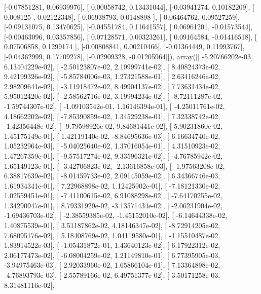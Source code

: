 \documentclass{article}
\begin{document}
       [-0.07851281,  0.06939976],
       [ 0.00058742,  0.13431044],
       [-0.03941274,  0.10182209],
       [ 0.008125  ,  0.02122348],
       [-0.06938793,  0.0148898 ],
       [ 0.06464762,  0.09527259],
       [-0.09131075,  0.13470625],
       [-0.04551784,  0.11641557],
       [ 0.06961201, -0.01573544],
       [-0.00463096,  0.03357856],
       [ 0.07128571,  0.00323261],
       [ 0.09164584, -0.01416518],
       [ 0.07506858,  0.1299174 ],
       [-0.00808841,  0.00210466],
       [-0.01364449,  0.11993767],
       [-0.04362999,  0.17709278],
       [-0.02909328, -0.01205964]]), array([[ -5.20766202e-03,   6.13404229e-02],
       [ -2.50123807e-02,   2.19999741e-02],
       [  8.40824373e-02,   9.42199326e-02],
       [ -5.85784006e-03,   1.27321588e-01],
       [  2.63416246e-02,   2.98209641e-02],
       [ -3.11918472e-02,   8.49904137e-02],
       [  7.73631434e-02,   5.95012420e-02],
       [ -2.58562716e-02,   3.19994234e-02],
       [ -8.72111287e-02,  -1.59744307e-02],
       [ -1.09103542e-01,   1.16146394e-01],
       [ -4.25011761e-02,   4.18662202e-02],
       [ -7.85390859e-02,   1.34529238e-01],
       [  7.32338742e-02,  -1.42356448e-02],
       [ -9.79598926e-02,   9.84681441e-02],
       [  5.90231860e-02,   1.45175149e-01],
       [  1.42119140e-02,  -8.84695636e-03],
       [  6.16634740e-02,   1.05232964e-03],
       [ -5.04025640e-02,   1.37016054e-01],
       [  4.31510923e-02,   1.47267359e-01],
       [ -9.57517274e-02,   9.33596321e-02],
       [ -4.76785942e-02,   1.65149123e-01],
       [ -3.42706823e-02,  -2.13616858e-03],
       [ -1.97563208e-02,   6.38817639e-02],
       [ -8.01459733e-02,   2.09145059e-02],
       [  6.34366746e-03,   1.61934341e-01],
       [  7.22968898e-02,   1.12425902e-01],
       [ -7.18121330e-02,   1.02559451e-01],
       [ -7.41100615e-02,   6.91088298e-02],
       [ -7.64170255e-02,   1.34290947e-01],
       [  8.79331929e-02,  -3.13571434e-02],
       [ -2.06231904e-02,  -1.69436703e-02],
       [ -2.38559385e-02,  -1.45152010e-02],
       [ -6.14644338e-02,   1.40875539e-01],
       [  3.51187862e-02,   4.18146347e-02],
       [ -8.72914205e-02,   7.68095176e-02],
       [  5.18408769e-02,   1.04119580e-01],
       [ -1.15510487e-02,   1.83914522e-03],
       [ -1.05431872e-01,   1.43640123e-02],
       [  6.17922312e-02,   2.06177473e-02],
       [ -6.08004259e-02,   1.21149810e-01],
       [  6.77395905e-03,  -3.94975463e-03],
       [  2.92033960e-02,   1.65866104e-01],
       [  7.13364898e-02,  -4.76893793e-03],
       [  2.55789166e-02,   6.49751377e-02],
       [  3.50171258e-03,   8.31481116e-02],
\end{document}
